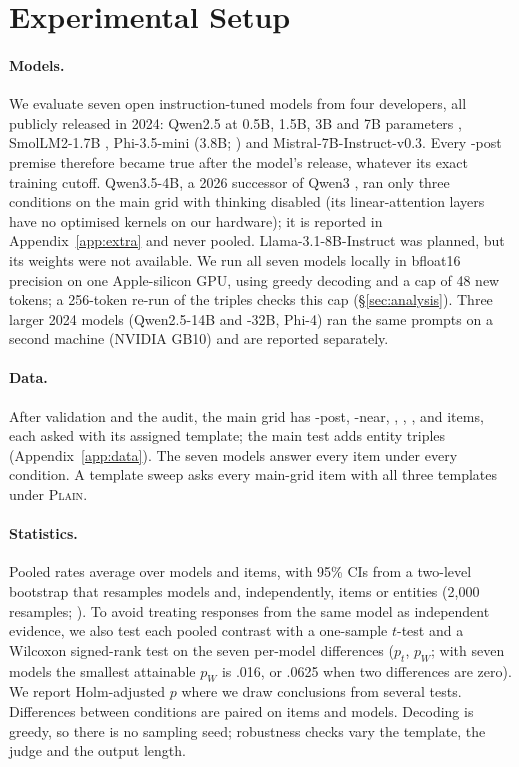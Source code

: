 \section{Experimental Setup}
\label{sec:setup}

\paragraph{Models.}
We evaluate seven open instruction-tuned models from four developers, all publicly released in 2024: Qwen2.5 at 0.5B, 1.5B, 3B and 7B parameters \citep{qwen2025qwen25}, SmolLM2-1.7B \citep{allal2025smollm2}, Phi-3.5-mini (3.8B; \citealp{abdin2024phi3}) and Mistral-7B-Instruct-v0.3. Every \NEW{}-post premise therefore became true after the model's release, whatever its exact training cutoff. Qwen3.5-4B, a 2026 successor of Qwen3 \citep{yang2025qwen3}, ran only three conditions on the main grid with thinking disabled (its linear-attention layers have no optimised kernels on our hardware); it is reported in Appendix~\ref{app:extra} and never pooled. Llama-3.1-8B-Instruct \citep{grattafiori2024llama3} was planned, but its weights were not available. We run all seven models locally in bfloat16 precision on one Apple-silicon GPU, using greedy decoding and a cap of 48 new tokens; a 256-token re-run of the triples checks this cap (\S\ref{sec:analysis}). Three larger 2024 models (Qwen2.5-14B and -32B, Phi-4) ran the same prompts on a second machine (NVIDIA GB10) and are reported separately.

\paragraph{Data.}
After validation and the audit, the main grid has \WNGNew{} \NEW{}-post, \WNGNear{} \NEW{}-near, \WNGOld{} \OLD{}, \WNGStre{} \STRE{}, \WNGStrl{} \STRL{}, \WNGStp{} \STP{} and \WNGNev{} \NEV{} items, each asked with its assigned template; the main test adds \WNTri{} entity triples (Appendix~\ref{app:data}). The seven models answer every item under every condition. A template sweep asks every main-grid item with all three templates under \textsc{Plain}.

\paragraph{Statistics.}
Pooled rates average over models and items, with 95\% CIs from a two-level bootstrap that resamples models and, independently, items or entities (2{,}000 resamples; \citealp{efron1993bootstrap}). To avoid treating responses from the same model as independent evidence, we also test each pooled contrast with a one-sample $t$-test and a Wilcoxon signed-rank test on the seven per-model differences ($p_t$, $p_W$; with seven models the smallest attainable $p_W$ is .016, or .0625 when two differences are zero). We report Holm-adjusted $p$ \citep{holm1979} where we draw conclusions from several tests. Differences between conditions are paired on items and models. Decoding is greedy, so there is no sampling seed; robustness checks vary the template, the judge and the output length.


